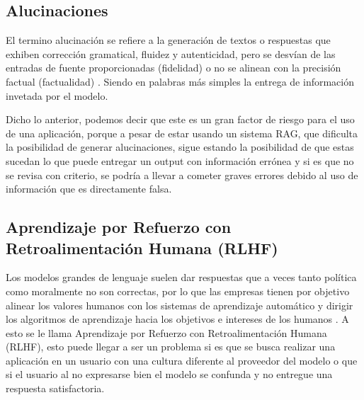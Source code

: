 \subsection{Alucinaciones}

El termino alucinación se refiere a la generación de textos o respuestas que exhiben corrección gramatical, fluidez y autenticidad,
pero se desvían de las entradas de fuente proporcionadas (fidelidad) o no se alinean con la precisión factual (factualidad) \cite{alucionacion1}.
Siendo en palabras más simples la entrega de información invetada por el modelo.

Dicho lo anterior, podemos decir que este es un gran factor de riesgo para el uso de una aplicación, porque a pesar de estar usando un 
sistema RAG, que dificulta la posibilidad de generar alucinaciones, sigue estando la posibilidad de que estas sucedan lo que puede 
entregar un output con información errónea y si es que no se revisa con criterio, se podría a llevar a cometer graves errores debido 
al uso de información que es directamente falsa.

\subsection{Aprendizaje por Refuerzo con Retroalimentación Humana (RLHF)}

Los modelos grandes de lenguaje suelen dar respuestas que a veces tanto política como moralmente no son correctas, por lo que 
las empresas tienen por objetivo alinear los valores humanos con los sistemas de aprendizaje automático y dirigir los algoritmos 
de aprendizaje hacia los objetivos e intereses de los humanos \cite{RLHF}. A esto se le llama Aprendizaje por Refuerzo con 
Retroalimentación Humana (RLHF), esto puede llegar a ser un problema si es que se busca realizar una aplicación en un usuario con una 
cultura diferente al proveedor del modelo o que si el usuario al no expresarse bien el modelo se confunda y no entregue una respuesta 
satisfactoria.





